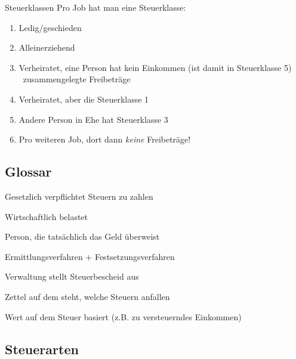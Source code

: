 \documentclass{beamer}
\begin{document}
			\begin{frame}{Steuerklassen}
				Pro Job hat man eine Steuerklasse:
				\begin{enumerate}[I]
					\item Ledig/geschieden
					\item Alleinerziehend
					\item Verheiratet, eine Person hat kein Einkommen (ist damit in Steuerklasse 5) \textrightarrow\ zusammengelegte Freibeträge
					\item Verheiratet, aber die Steuerklasse 1
					\item Andere Person in Ehe hat Steuerklasse 3
					\item Pro weiteren Job, dort dann \textit{keine} Freibeträge!
				\end{enumerate}
			\end{frame}
	
		\subsection{Glossar}
	
			\begin{frame}
				\begin{description}[Steuerfestsetzung]
					\item[Steuerschuldner] Gesetzlich verpflichtet Steuern zu zahlen
					\item[Steuerträger] Wirtschaftlich belastet
					\item[Steuerzahler] Person, die tatsächlich das Geld überweist
					\pause
					\item[Veranlagung] Ermittlungsverfahren + Festsetzungsverfahren
					\item[Steuerfestsetzung] Verwaltung stellt Steuerbescheid aus
					\pause
					\item[Steuerbescheid] Zettel auf dem steht, welche Steuern anfallen
					\item[Bemessungsgrundlage] Wert auf dem Steuer basiert (z.B. zu versteuerndes Einkommen)
				\end{description}
			\end{frame}
	
		\subsection{Steuerarten}
		
\end{document}

